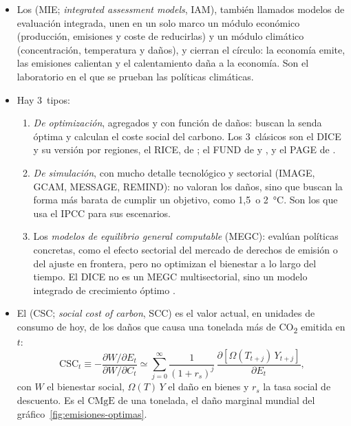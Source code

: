 \documentclass[11pt]{article}
\begin{document}
\begin{itemize}
\item Los  (MIE; \emph{integrated assessment models}, IAM), también llamados modelos de evaluación integrada, unen en un solo marco un módulo económico (producción, emisiones y coste de reducirlas) y un módulo climático (concentración, temperatura y daños), y cierran el círculo: la economía emite, las emisiones calientan y el calentamiento daña a la economía. Son el laboratorio en el que se prueban las políticas climáticas.
\item Hay 3~tipos:
  \begin{enumerate}
  \item \emph{De optimización}, agregados y con función de daños: buscan la senda óptima y calculan el coste social del carbono. Los 3~clásicos son el DICE y su versión por regiones, el RICE, de ; el FUND de  y \nocite{AnthoffTol2013Uncertainty}, y el PAGE de \nocite{Hope2006Marginal}.
  \item \emph{De simulación}, con mucho detalle tecnológico y sectorial (IMAGE, GCAM, MESSAGE, REMIND): no valoran los daños, sino que buscan la forma más barata de cumplir un objetivo, como 1,5~o 2~°C. Son los que usa el IPCC para sus escenarios.
  \item Los \emph{modelos de equilibrio general computable} (MEGC): evalúan políticas concretas, como el efecto sectorial del mercado de derechos de emisión o del ajuste en frontera, pero no optimizan el bienestar a lo largo del tiempo. El DICE no es un MEGC multisectorial, sino un modelo integrado de crecimiento óptimo .
  \end{enumerate}
\item El  (CSC; \emph{social cost of carbon}, SCC) es el valor actual, en unidades de consumo de hoy, de los daños que causa una tonelada más de CO\textsubscript{2} emitida en $t$:
  \begin{equation}\label{eq:csc}
  \mathrm{CSC}_t\equiv-\frac{\partial W/\partial E_t}{\partial W/\partial C_t}\simeq\sum_{j=0}^{\infty}\frac{1}{(1+r_s)^{j}}\,\frac{\partial\left[\Omega(T_{t+j})\,Y_{t+j}\right]}{\partial E_t},
  \end{equation}
  con $W$ el bienestar social, $\Omega(T)\,Y$ el daño en bienes y $r_s$ la tasa social de descuento. Es el $\mathrm{CMgE}$ de una tonelada, el daño marginal mundial del gráfico~\ref{fig:emisiones-optimas}.
  \begin{itemize}

\end{itemize}
\end{itemize}
\end{document}
